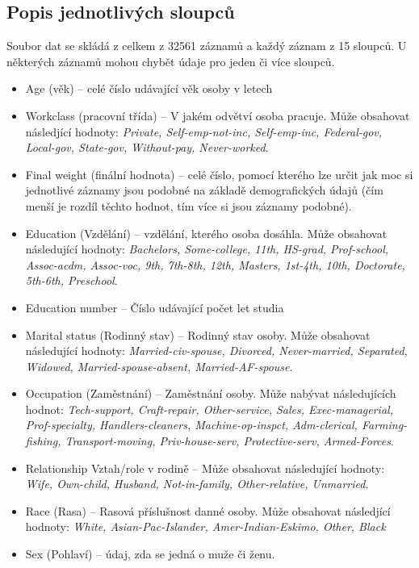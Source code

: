 \documentclass[11pt,a4paper,titlepage]{article}
\begin{document}
        \subsection{Popis jednotlivých sloupců}
            Soubor dat se skládá z celkem z 32561 záznamů a každý záznam z 15 sloupců. U některých záznamů mohou chybět údaje pro jeden či více sloupců.
            \begin{itemize}
                \item Age (věk) -- celé číslo udávající věk osoby v letech
                \item Workclass (pracovní třída) -- V jakém odvětví osoba pracuje. Může obsahovat následjící hodnoty: \textit{Private, Self-emp-not-inc, Self-emp-inc, Federal-gov, Local-gov, State-gov, Without-pay, Never-worked}.
                \item Final weight (finální hodnota) -- celé číslo, pomocí kterého lze určit jak moc si jednotlivé záznamy jsou podobné na základě demografických údajů (čím menší je rozdíl těchto hodnot, tím více si jsou záznamy podobné).
                \item Education (Vzdělání) -- vzdělání, kterého osoba dosáhla. Může obsahovat následující hodnoty: \textit{Bachelors, Some-college, 11th, HS-grad, Prof-school, Assoc-acdm, Assoc-voc, 9th, 7th-8th, 12th, Masters, 1st-4th, 10th, Doctorate, 5th-6th, Preschool}.
                \item Education number -- Číslo udávající počet let studia
                \item Marital status (Rodinný stav) -- Rodinný stav osoby. Může obsahovat následující hodnoty: \textit{Married-civ-spouse, Divorced, Never-married, Separated, Widowed, Married-spouse-absent, Married-AF-spouse}.
                \item Occupation (Zaměstnání) -- Zaměstnání osoby. Může nabývat následujících hodnot: \textit{Tech-support, Craft-repair, Other-service, Sales, Exec-managerial, Prof-specialty, Handlers-cleaners, Machine-op-inspct, Adm-clerical, Farming-fishing, Transport-moving, Priv-house-serv, Protective-serv, Armed-Forces}.
                \item Relationship Vztah/role v rodině -- Může obsahovat následující hodnoty: \textit{Wife, Own-child, Husband, Not-in-family, Other-relative, Unmarried}.
                \item Race (Rasa) -- Rasová příslušnost danné osoby. Může obsahovat následjící hodnoty: \textit{White, Asian-Pac-Islander, Amer-Indian-Eskimo, Other, Black}
                \item Sex (Pohlaví) -- údaj, zda se jedná o muže či ženu.

\end{itemize}
\end{document}
